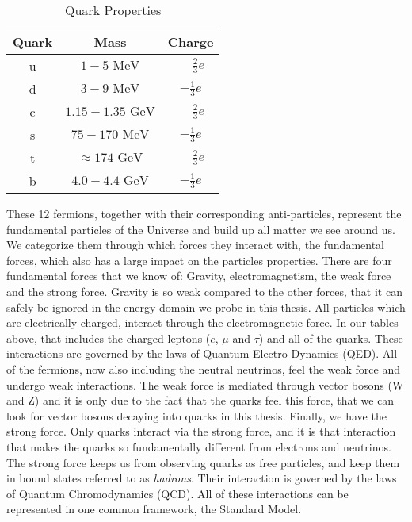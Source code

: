 \begin{table}
\begin{center}
\begin{tabular}{|c|c|c|}%
\hline
Quark & Mass & Charge \\%
\hline
u & $1-5 \mbox{ MeV}$         & $\phantom{-}\frac{2}{3} e$  \\%
d & $3-9 \mbox{ MeV}$         & $-\frac{1}{3} e$            \\%
c & $1.15-1.35 \mbox{ GeV}$   & $\phantom{-}\frac{2}{3} e$  \\%
s & $75-170 \mbox{ MeV}$      & $-\frac{1}{3}e$             \\%
t & $\approx 174 \mbox{ GeV}$ & $\phantom{-}\frac{2}{3} e$  \\%
b & $4.0-4.4 \mbox{ GeV}$     & $-\frac{1}{3} e$            \\%
\hline
\end{tabular}
\end{center}
\caption{Quark Properties}
\label{table:theory:quarkprop}
\end{table}
These 12 fermions, together with their corresponding anti-particles, represent the fundamental particles of the Universe and build up all matter we see around us. We categorize them through which forces they interact with, the fundamental forces, which also has a large impact on the particles properties.
There are four fundamental forces that we know of: Gravity, electromagnetism, the weak force and the strong force. Gravity is so weak compared to the other forces, that it can safely be ignored in the energy domain we probe in this thesis. 
All particles which are electrically charged, interact through the electromagnetic force. In our tables above, that includes the charged leptons ($e$, $\mu$ and $\tau$) and all of the quarks. These interactions are governed by the laws of Quantum Electro Dynamics (QED). All of the fermions, now also including the neutral neutrinos, feel the weak force and undergo weak interactions. The weak force is mediated through vector bosons (W and Z) and it is only due to the fact that the quarks feel this force, that we can look for vector bosons decaying into quarks in this thesis. Finally, we have the strong force. Only quarks interact via the strong force, and it is that interaction that makes the quarks so fundamentally different from electrons and neutrinos. The strong force keeps us from observing quarks as free particles, and keep them in bound states referred to as \emph{hadrons}. Their interaction is governed by the laws of Quantum Chromodynamics (QCD). All of these interactions can be represented in one common framework, the Standard Model.
